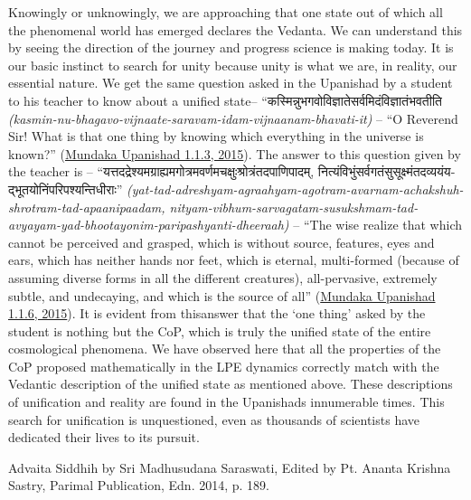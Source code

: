 \documentclass[twoside, 13pt]{article}
\begin{document}
{{{\fontsize{12}{14}\selectfont Knowingly or unknowingly, we are approaching that one state out of which all the phenomenal world has emerged declares the Vedanta. We can understand this by seeing the direction of the journey and progress science is making today. It is our basic instinct to search for unity because unity is what we are, in reality, our essential nature. We get the same question asked in the Upanishad by a student to his teacher to know about a unified state– \foreignlanguage{hindi}{{\fontsize{9}{11}\selectfont “कस्मिन्नुभगवोविज्ञातेसर्वमिदंविज्ञातंभवतीति }}\textit{(kasmin-nu-bhagavo-vijnaate-saravam-idam-vijnaanam-bhavati-it)} – “O Reverend Sir! What is that one thing by knowing which everything in the universe is known?” (\underline{Mundaka Upanishad 1.1.3, 2015}). The answer to this question given by the teacher is – \foreignlanguage{hindi}{{\fontsize{9}{11}\selectfont “यत्तदद्रेश्यमग्राह्यमगोत्रमवर्णमचक्षुःश्रोत्रंतदपाणिपादम्, नित्यंविभुंसर्वगतंसुसूक्ष्मंतदव्ययंयद्भूतयोनिंपरिपश्यन्तिधीराः”}} \textit{(yat-tad-adreshyam-agraahyam-agotram-avarn\break am-achakshuh-shrotram-tad-apaanipaadam, nityam-vibhum-sarvagatam-susukshmam-\break tad-avyayam-yad-bhootayonim-paripashyanti-dheeraah)} – “The wise realize that which cannot be perceived and grasped, which is without source, features, eyes and ears, which has neither hands nor feet, which is eternal, multi-formed (because of assuming diverse forms in all the different creatures), all-pervasive, extremely subtle, and undecaying, and which is the source of all” (\underline{Mundaka Upanishad 1.1.6, 2015}). It is evident from this\break answer that the ‘one thing’ asked by the student is nothing but the CoP, which is truly the unified state of the entire cosmological phenomena. We have observed here that all the properties of the CoP proposed mathematically in the LPE dynamics correctly match with the Vedantic description of the unified state as mentioned above. These descriptions of unification and reality are found in the Upanishads innumerable times. This search for unification is unquestioned, even as thousands of scientists have dedicated their lives to its pursuit.}


{\fontsize{12}{14}\selectfont
\begin{thebibliography}{99}\label{ref-1}

\bibitem{} Advaita Siddhih by Sri Madhusudana Saraswati, Edited by Pt. Ananta Krishna Sastry, Parimal Publication, Edn. 2014, p. 189.


\end{thebibliography}}}}
\end{document}
